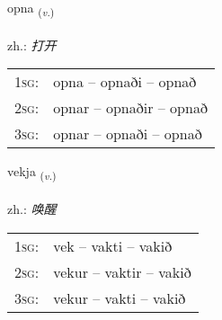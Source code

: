 \documentclass[frontgrid, backgrid]{flacards}\usepackage[]{graphicx}\usepackage[]{xcolor}
\begin{document}
\renewcommand{\flhead}{\vskip5pt \fboxsep=0pt {\small\bfseries\footnotesize Sagnorð | 动词}}
\renewcommand{\fcfoot}{\vskip5pt \fboxsep=0pt \hspace{2pt}{\small\bfseries\footnotesize 1K}}

\renewcommand{\blhead}{\vskip5pt {\small\bfseries\footnotesize Sagnorð | 动词 }}
\renewcommand{\bcfoot}{\vskip5pt \hspace{2pt}{\small\bfseries\footnotesize 1K}}


{opna \small{\textsubscript{(\textit{v.})}} \\[1ex] %
\textphonetic{[ɔhpna]} \\
zh.: \emph{打开} \\  [2ex]
\renewcommand*{\arraystretch}{0.8}
\begin{tabular}{p{1cm}l}
\textsc{1sg}: & opna -- opnaði -- opnað \\ 
\textsc{2sg}: & opnar -- opnaðir -- opnað \\ 
\textsc{3sg}: & opnar -- opnaði -- opnað \\ 
\end{tabular}
}

\renewcommand{\flhead}{\vskip5pt \fboxsep=0pt {\small\bfseries\footnotesize Sagnorð | 动词}}
\renewcommand{\fcfoot}{\vskip5pt \fboxsep=0pt \hspace{2pt}{\small\bfseries\footnotesize 1K}}

\renewcommand{\blhead}{\vskip5pt {\small\bfseries\footnotesize Sagnorð | 动词 }}
\renewcommand{\bcfoot}{\vskip5pt \hspace{2pt}{\small\bfseries\footnotesize 1K}}


{vekja \small{\textsubscript{(\textit{v.})}} \\[1ex] %
\textphonetic{[vɛːca]} \\
zh.: \emph{唤醒} \\  [2ex]
\renewcommand*{\arraystretch}{0.8}
\begin{tabular}{p{1cm}l}
\textsc{1sg}: & vek -- vakti -- vakið \\ 
\textsc{2sg}: & vekur -- vaktir -- vakið \\ 
\textsc{3sg}: & vekur -- vakti -- vakið \\ 
\end{tabular}
}
\end{document}
